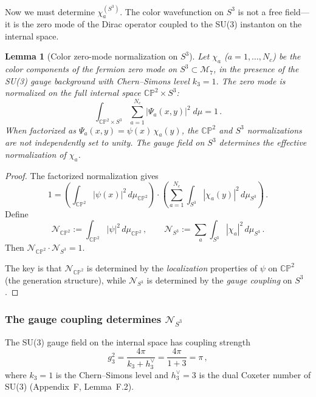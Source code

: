 \documentclass[11pt,a4paper]{article}
\newcommand{\CP}{\mathbb{CP}}
\newtheorem{lemma}[theorem]{Lemma}
\theoremstyle{definition}
\theoremstyle{remark}
\begin{document}
Now we must determine $\chi_a^{(S^3)}$.  The color wavefunction on
$S^3$ is not a free field---it is the zero mode of the Dirac operator
coupled to the SU(3) instanton on the internal space.

\begin{lemma}[Color zero-mode normalization on $S^3$]
\label{lem:color-norm}
Let $\chi_a$ ($a = 1, \ldots, N_c$) be the color components of the
fermion zero mode on $S^3 \subset \mathcal{M}_7$, in the presence of
the SU(3) gauge background with Chern--Simons level $k_3 = 1$.
The zero mode is normalized on the \emph{full} internal space
$\CP^2 \times S^3$:
\begin{equation}\label{eq:full-norm}
\int_{\CP^2 \times S^3}
\sum_{a=1}^{N_c} |\Psi_a(x,y)|^2\;d\mu = 1\,.
\end{equation}
When factorized as $\Psi_a(x,y) = \psi(x)\,\chi_a(y)$, the $\CP^2$
and $S^3$ normalizations are \emph{not} independently set to unity.
The gauge field on $S^3$ determines the effective normalization of
$\chi_a$.
\end{lemma}

\begin{proof}
The factorized normalization gives
\begin{equation}
1 = \left(\int_{\CP^2} |\psi(x)|^2\,d\mu_{\CP^2}\right)
\cdot \left(\sum_{a=1}^{N_c}\int_{S^3}
|\chi_a(y)|^2\,d\mu_{S^3}\right)\,.
\end{equation}
Define
\begin{equation}
\mathcal{N}_{\CP^2} := \int_{\CP^2} |\psi|^2\,d\mu_{\CP^2}\,,
\qquad
\mathcal{N}_{S^3} := \sum_a \int_{S^3} |\chi_a|^2\,d\mu_{S^3}\,.
\end{equation}
Then $\mathcal{N}_{\CP^2} \cdot \mathcal{N}_{S^3} = 1$.

The key is that $\mathcal{N}_{\CP^2}$ is determined by the
\emph{localization} properties of $\psi$ on $\CP^2$ (the generation
structure), while $\mathcal{N}_{S^3}$ is determined by the
\emph{gauge coupling} on $S^3$.
\end{proof}

\subsubsection{The gauge coupling determines $\mathcal{N}_{S^3}$}

The SU(3) gauge field on the internal space has coupling strength
\begin{equation}\label{eq:gauge-coupling}
g_3^2 = \frac{4\pi}{k_3 + h_3^\vee}
= \frac{4\pi}{1 + 3} = \pi\,,
\end{equation}
where $k_3 = 1$ is the Chern--Simons level and $h_3^\vee = 3$ is the
dual Coxeter number of SU(3) (Appendix~F, Lemma~F.2).
\end{document}
